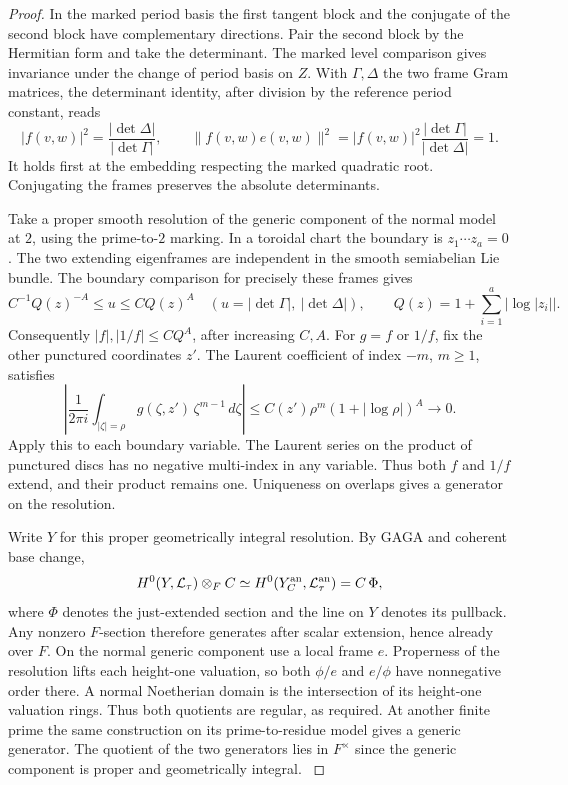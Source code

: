 \begin{proof}
In the marked period basis the first tangent block and the conjugate
of the second block have complementary directions. Pair the second
block by the Hermitian form and take the determinant. The marked
level comparison gives invariance under the change of period basis
on \(Z\). With \(\Gamma,\Delta\) the two frame Gram matrices, the
determinant identity, after division by the reference period constant,
reads
\[
 |f(v,w)|^2=\frac{|\det\Delta|}{|\det\Gamma|},\qquad
 \|f(v,w)e(v,w)\|^2=|f(v,w)|^2\frac{|\det\Gamma|}{|\det\Delta|}=1.
\]
It holds first at the embedding respecting the marked quadratic root.
Conjugating the frames preserves the absolute determinants.
\label{cor:deep-cover-flat-degree-2}

Take a proper smooth resolution of the generic component of the
normal model at \(2\), using the prime-to-\(2\) marking. In a
toroidal chart the boundary is \(z_1\cdots z_a=0\). The two
extending eigenframes are independent in the smooth semiabelian Lie
bundle. The boundary comparison for precisely these frames gives
\[
 C^{-1}Q(z)^{-A}\le u\le C Q(z)^A\quad (u=|\det\Gamma|,\ |\det\Delta|),
 \qquad Q(z)=1+\sum_{i=1}^a|\log|z_i|| .
\]
Consequently \(|f|,|1/f|\le C Q^A\), after increasing \(C,A\).
For \(g=f\) or \(1/f\), fix the other punctured coordinates \(z'\).
The Laurent coefficient of index \(-m\), \(m\ge1\), satisfies
\[
 \left|\frac{1}{2\pi i}\int_{|\zeta|=\rho}
          g(\zeta,z')\,\zeta^{m-1}\,d\zeta\right|
 \le C(z')\rho^m(1+|\log\rho|)^A\longrightarrow0 .
\]
Apply this to each boundary variable. The Laurent series on the
product of punctured discs has no negative multi-index in any
variable. Thus both \(f\) and \(1/f\) extend, and their product
remains one. Uniqueness on overlaps gives a generator on the resolution.
\label{cor:deep-cover-flat-degree-3}

Write \(Y\) for this proper geometrically integral resolution.
By GAGA and coherent base change,
\[
 H^0(Y,\mathcal L_\tau)\otimes_F\mathbb C
 \simeq H^0(Y_{\mathbb C}^{\rm an},\mathcal L_\tau^{\rm an})
 =\mathbb C\,\Phi ,
\]
where \(\Phi\) denotes the just-extended section and the line on
\(Y\) denotes its pullback. Any nonzero \(F\)-section therefore
generates after scalar extension, hence already over \(F\).
On the normal generic component use a local frame \(e\). Properness
of the resolution lifts each height-one valuation, so both
\(\phi/e\) and \(e/\phi\) have nonnegative order there. A normal
Noetherian domain is the intersection of its height-one valuation
rings. Thus both quotients are regular, as required. At another
finite prime the same construction on its prime-to-residue model
gives a generic generator. The quotient of the two generators lies
in \(F^\times\) since the generic component is proper and
geometrically integral. \label{cor:deep-cover-flat-degree-4}
\end{proof}

